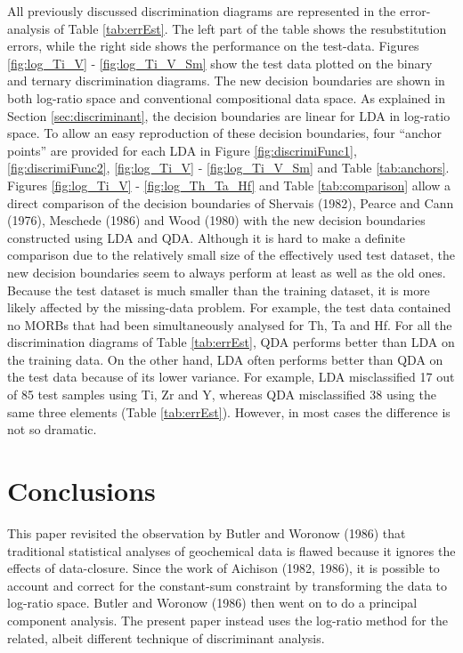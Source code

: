 \documentclass{article}
\begin{document}
All  previously discussed discrimination  diagrams are  represented in
the  error-analysis of Table  \ref{tab:errEst}. The  left part  of the
table shows the resubstitution errors,  while the right side shows the
performance   on   the   test-data.   Figures   \ref{fig:log_Ti_V}   -
\ref{fig:log_Ti_V_Sm}  show the test  data plotted  on the  binary and
ternary  discrimination  diagrams.  The  new  decision boundaries  are
shown  in both  log-ratio  space and  conventional compositional  data
space.  As  explained in Section  \ref{sec:discriminant}, the decision
boundaries are  linear for LDA in  log-ratio space.  To  allow an easy
reproduction of these decision  boundaries, four ``anchor points'' are
provided   for    each   LDA   in    Figure   \ref{fig:discrimiFunc1},
\ref{fig:discrimiFunc2},  \ref{fig:log_Ti_V}  -  \ref{fig:log_Ti_V_Sm}
and    Table   \ref{tab:anchors}.    Figures    \ref{fig:log_Ti_V}   -
\ref{fig:log_Th_Ta_Hf} and  Table \ref{tab:comparison} allow  a direct
comparison of  the decision boundaries of Shervais  (1982), Pearce and
Cann (1976),  Meschede (1986)  and Wood (1980)  with the  new decision
boundaries constructed using LDA and  QDA. Although it is hard to make
a  definite  comparison  due  to  the relatively  small  size  of  the
effectively  used test dataset,  the new  decision boundaries  seem to
always perform  at least  as well  as the old  ones. Because  the test
dataset is much  smaller than the training dataset,  it is more likely
affected  by the  missing-data problem.   For example,  the  test data
contained no  MORBs that had  been simultaneously analysed for  Th, Ta
and   Hf.    For   all    the   discrimination   diagrams   of   Table
\ref{tab:errEst},  QDA  performs  better  than  LDA  on  the  training
data. On  the other hand,  LDA often performs  better than QDA  on the
test  data   because  of  its   lower  variance.   For   example,  LDA
misclassified 17  out of 85 test  samples using Ti, Zr  and Y, whereas
QDA   misclassified  38   using   the  same   three  elements   (Table
\ref{tab:errEst}).  However,  in most cases  the difference is  not so
dramatic.

\section{Conclusions}

This paper revisited the observation by Butler and Woronow (1986) that
traditional statistical analyses of geochemical data is flawed because
it ignores  the effects of  data-closure.  Since the work  of Aichison
(1982,  1986),  it  is  possible   to  account  and  correct  for  the
constant-sum constraint  by transforming the data  to log-ratio space.
Butler and  Woronow (1986)  then went on  to do a  principal component
analysis.  The present paper instead uses the log-ratio method for the
related, albeit different technique of discriminant analysis.\\
\end{document}
